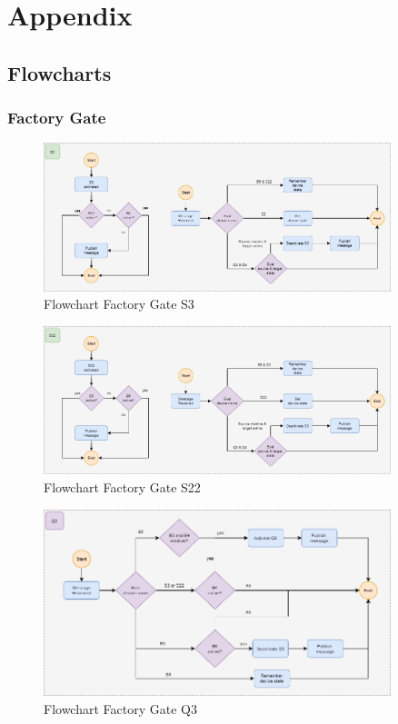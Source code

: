 \newpage
{}
\chapter*{Appendix}

\section{Flowcharts}

\subsection*{Factory Gate}

\begin{figure}[H]
    \centering
    \includegraphics[width=0.9\textwidth]{images/flowchart_factory_gate_s3.png}
    \caption{Flowchart Factory Gate S3}
    \label{fig:FlowChartFactoryDoorS3}
\end{figure}

\begin{figure}[H]
    \centering
    \includegraphics[width=0.9\textwidth]{images/flowchart_factory_gate_s22.png}
    \caption{Flowchart Factory Gate S22}
    \label{fig:FlowChartFactoryDoorS22}
\end{figure}

\begin{figure}[H]
    \centering
    \includegraphics[width=0.9\textwidth]{images/flowchart_factory_gate_q3.png}
    \caption{Flowchart Factory Gate Q3}
    \label{fig:FlowChartFactoryDoorQ3}
\end{figure}

